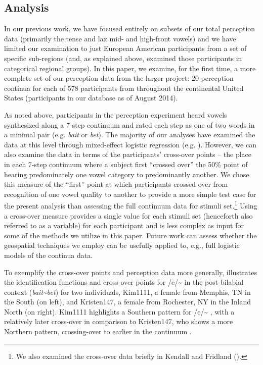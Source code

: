 \documentclass[output=paper]{LSP/langsci}
\begin{document}
\subsection{ Analysis}
In our previous work, we have focused entirely on subsets of our total perception data (primarily the tense and lax mid- and high-front vowels) and we have limited our examination to just European American participants from a set of specific sub-regions (and, as explained above, examined those participants in categorical regional groups). In this paper, we examine, for the first time, a more complete set of our perception data from the larger project: 20 perception continua for each of 578 participants from throughout the continental United States (participants in our database as of August 2014). 

As noted above, participants in the perception experiment heard vowels synthesized along a 7-step continuum and rated each step as one of two words in a minimal pair (e.g. \textit{bait} or \textit{bet}). The majority of our analyses have examined the data at this level through mixed-effect logistic regression (e.g. \citealt{kendall_variation_2012}). However, we can also examine the data in terms of the participants’ cross-over points – the place in each 7-step continuum where a subject first “crossed over” the 50\% point of hearing predominately one vowel category to predominantly another. We chose this measure of the “first” point at which participants crossed over from recognition of one vowel quality to another to provide a more simple test case for the present analysis than assessing the full continuum data for stimuli set.\footnote{We also examined the cross-over data briefly in Kendall and Fridland (\citeyear{kendall_mapping_2010,kendall_variation_2012}).} Using a cross-over measure provides a single value for each stimuli set (henceforth also referred to as a variable) for each participant and is less complex as input for some of the methods we utilize in this paper. Future work can assess whether the geospatial techniques we employ can be usefully applied to, e.g., full logistic models of the continua data.

To exemplify the cross-over points and perception data more generally,  illustrates the identification functions and cross-over points for /e/\~{}
in the post-bilabial context (\textit{bait\~{}bet}) for two individuals, Kim1111, a female from Memphis, TN in the South (on left), and Kristen147, a female from Rochester, NY in the Inland North (on right). Kim1111 highlights a Southern pattern for /e/\~{}
, with a relatively later cross-over in comparison to Kristen147, who shows a more Northern pattern, crossing-over to 
earlier in the continuum \citep{kendall_variation_2012}.
\end{document}
